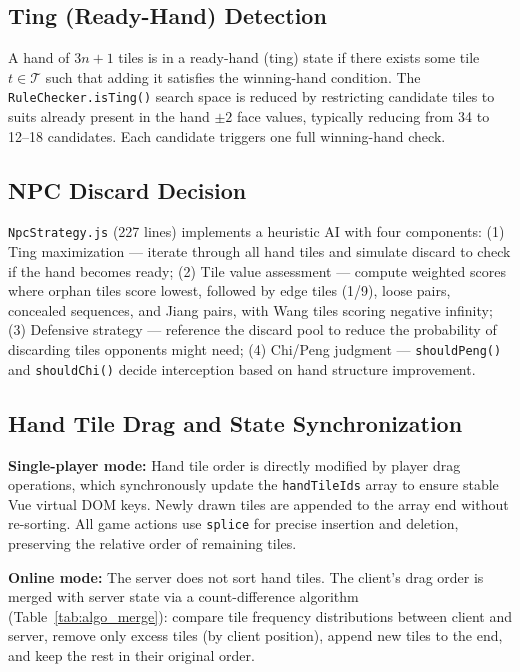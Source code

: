 \documentclass[11pt,a4paper]{article}
\begin{document}
\subsection{Ting (Ready-Hand) Detection}

A hand of $3n+1$ tiles is in a ready-hand (ting) state if there exists some tile $t \in \mathcal{T}$ such that adding it satisfies the winning-hand condition. The \texttt{RuleChecker.isTing()} search space is reduced by restricting candidate tiles to suits already present in the hand $\pm2$ face values, typically reducing from 34 to 12--18 candidates. Each candidate triggers one full winning-hand check.

\subsection{NPC Discard Decision}

\texttt{NpcStrategy.js} (227 lines) implements a heuristic AI with four components: (1) Ting maximization — iterate through all hand tiles and simulate discard to check if the hand becomes ready; (2) Tile value assessment — compute weighted scores where orphan tiles score lowest, followed by edge tiles (1/9), loose pairs, concealed sequences, and Jiang pairs, with Wang tiles scoring negative infinity; (3) Defensive strategy — reference the discard pool to reduce the probability of discarding tiles opponents might need; (4) Chi/Peng judgment — \texttt{shouldPeng()} and \texttt{shouldChi()} decide interception based on hand structure improvement.

\subsection{Hand Tile Drag and State Synchronization}

\textbf{Single-player mode:} Hand tile order is directly modified by player drag operations, which synchronously update the \texttt{handTileIds} array to ensure stable Vue virtual DOM keys. Newly drawn tiles are appended to the array end without re-sorting. All game actions use \texttt{splice} for precise insertion and deletion, preserving the relative order of remaining tiles.

\textbf{Online mode:} The server does not sort hand tiles. The client's drag order is merged with server state via a count-difference algorithm (Table~\ref{tab:algo_merge}): compare tile frequency distributions between client and server, remove only excess tiles (by client position), append new tiles to the end, and keep the rest in their original order.
\end{document}

